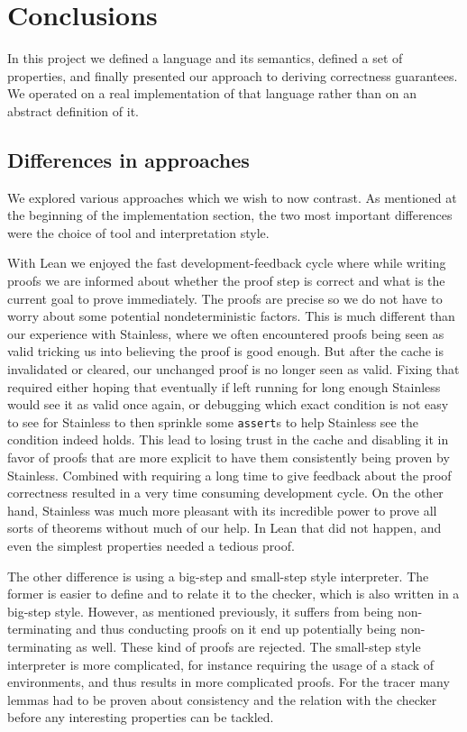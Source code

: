 \section{Conclusions}\label{sec:conclusions}

In this project we defined a language and its semantics, defined a set of properties, and finally presented our approach to deriving correctness guarantees. We operated on a real implementation of that language rather than on an abstract definition of it.

\subsection{Differences in approaches}

We explored various approaches which we wish to now contrast. As mentioned at the beginning of the implementation section, the two most important differences were the choice of tool and interpretation style.

With Lean we enjoyed the fast development-feedback cycle where while writing proofs we are informed about whether the proof step is correct and what is the current goal to prove immediately. The proofs are precise so we do not have to worry about some potential nondeterministic factors. This is much different than our experience with Stainless, where we often encountered proofs being seen as valid tricking us into believing the proof is good enough. But after the cache is invalidated or cleared, our unchanged proof is no longer seen as valid. Fixing that required either hoping that eventually if left running for long enough Stainless would see it as valid once again, or debugging which exact condition is not easy to see for Stainless to then sprinkle some \texttt{assert}s to help Stainless see the condition indeed holds. This lead to losing trust in the cache and disabling it in favor of proofs that are more explicit to have them consistently being proven by Stainless. Combined with requiring a long time to give feedback about the proof correctness resulted in a very time consuming development cycle. On the other hand, Stainless was much more pleasant with its incredible power to prove all sorts of theorems without much of our help. In Lean that did not happen, and even the simplest properties needed a tedious proof.

The other difference is using a big-step and small-step style interpreter. The former is easier to define and to relate it to the checker, which is also written in a big-step style. However, as mentioned previously, it suffers from being non-terminating and thus conducting proofs on it end up potentially being non-terminating as well. These kind of proofs are rejected. The small-step style interpreter is more complicated, for instance requiring the usage of a stack of environments, and thus results in more complicated proofs. For the tracer many lemmas had to be proven about consistency and the relation with the checker before any interesting properties can be tackled.

